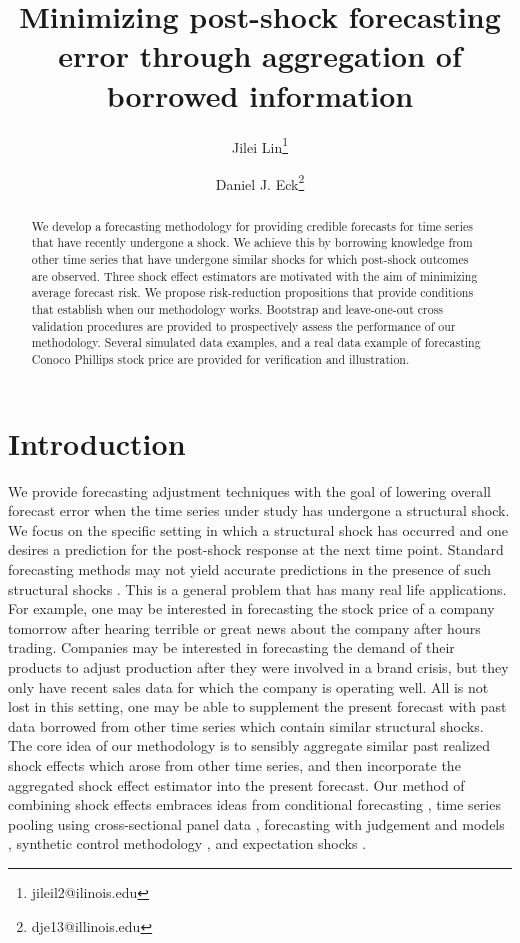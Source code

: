 \documentclass[11pt]{article}
\title{Minimizing post-shock forecasting error through aggregation of borrowed information}
\author{Jilei Lin\thanks{jileil2@ilinois.edu} }
\author{Daniel J. Eck\thanks{dje13@illinois.edu}}
\affil{Department of Statistics, University of Illinois at Urbana-Champaign}
\theoremstyle{definition}
\begin{document}
\maketitle
\begin{abstract}
    We develop a forecasting methodology for providing credible forecasts for time series that have recently undergone a shock. We achieve this by borrowing knowledge from other time series that have undergone similar shocks for which post-shock outcomes are observed. Three shock effect estimators are motivated with the aim of minimizing average forecast risk. We propose risk-reduction propositions that provide conditions that establish when our methodology works. Bootstrap and leave-one-out cross validation procedures are provided to prospectively assess the performance of our methodology. Several simulated data examples, and a real data example of forecasting Conoco Phillips stock price are provided for verification and illustration.
\end{abstract}




\section{Introduction}


We provide forecasting adjustment techniques with the goal of lowering overall forecast error when the time series under study has undergone a structural shock. We focus on the specific setting in which a structural shock has occurred and one desires a prediction for the post-shock response at the next time point. Standard forecasting methods may not yield accurate predictions in the presence of such structural shocks \citep{baumeister2014real}. This is a general problem that has many real life applications. For example, one may be interested in forecasting the stock price of a company tomorrow after hearing terrible or great news about the company  after hours trading. Companies may be interested in forecasting the demand of their products to adjust production after they were involved in a brand crisis, but they only have recent sales data for which the company is operating well. All is not lost in this setting, one may be able to supplement the present forecast with past data borrowed from other time series which contain similar structural shocks. The core idea of our methodology is to sensibly aggregate similar past realized shock effects which arose from other time series, and then incorporate the aggregated shock effect estimator into the present forecast. Our method of combining shock effects embraces ideas from conditional forecasting \citep{baumeister2014real, kilian2017structural}, time series pooling using cross-sectional panel data \citep{ramaswamy1993empirical, pesaran1999pooled, hoogstrate2000pooling, baltagi2008forecasting, koop2012forecasting, liu2020forecasting}, forecasting with judgement and models \citep{svensson2005monetary, monti2008forecast}, synthetic control methodology \citep{abadie2010synthetic, agarwal2020two}, and expectation shocks \citep{croushore2006data, baumeister2014general, clements2019measuring}. 
\end{document}
